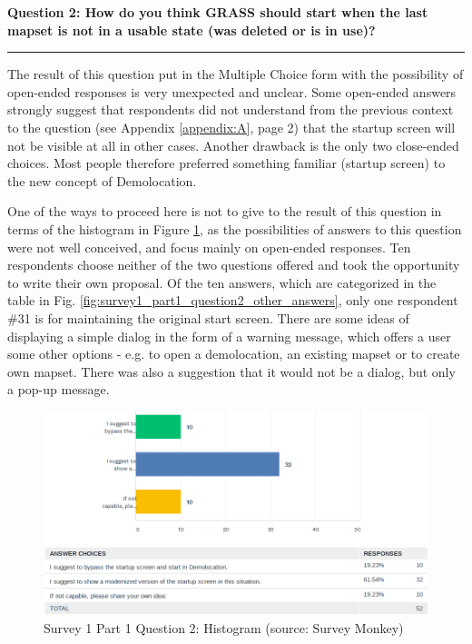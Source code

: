 \documentclass[a4paper,10pt,twoside]{article}
\begin{document}
\newpage
\noindent \textbf{Question 2: How do you think GRASS should start when the last mapset is not in a usable state (was deleted or is in use)?}
\par\noindent\rule{\textwidth}{0.4pt}
\noindent The result of this question put in the Multiple Choice form with the possibility of open-ended responses is very unexpected and unclear. Some open-ended answers strongly suggest that respondents did not understand from the previous context to the question (see Appendix \ref{appendix:A}, page 2) that the startup screen will not be visible at all in other cases. Another drawback is the only two close-ended choices. Most people therefore preferred something familiar (startup screen) to the new concept of Demolocation.

One of the ways to proceed here is not to give to the result of this question in terms of the histogram in Figure \ref{fig:survey1_part1_question2_histogram_sm}, as the possibilities of answers to this question were not well conceived, and focus mainly on open-ended responses. Ten respondents choose neither of the two questions offered and took the opportunity to write their own proposal. Of the ten answers, which are categorized in the table in Fig. \ref{fig:survey1_part1_question2_other_answers}, only one respondent \#31 is for maintaining the original start screen. There are some ideas of displaying a simple dialog in the form of a warning message, which offers a user some other options - e.g. to open a demolocation, an existing mapset or to create own mapset. There was also a suggestion that it would not be a dialog, but only a pop-up message.

\vspace{0.3cm}
\begin{figure}[hbt!] 
\begin{center}
\includegraphics[width=17cm]{../surveys/analyzed_data/survey1_part1_question2_histogram_sm.png} 
\caption[Survey 1 Part 1 Question 2: Histogram]{Survey 1 Part 1 Question 2: Histogram (source: Survey Monkey)}
\label{fig:survey1_part1_question2_histogram_sm}
\end{center}
\end{figure}
\end{document}
